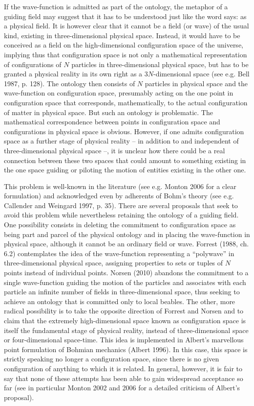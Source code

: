 \documentclass[12pt]{article}
\theoremstyle{definition}
\begin{document}
If the wave-function is admitted as part of the ontology, the metaphor of a guiding field may suggest that it has to be understood just like the word says: as a physical field. It is however clear that it cannot be a field (or wave) of the usual kind, existing in three-dimensional physical space. Instead, it would have to be conceived as a field on the high-dimensional configuration space of the universe, implying thus that configuration space is not only a mathematical representation of configurations of $N$ particles in three-dimensional physical space, but has to be granted a physical reality in its own right as a $3N$-dimensional space (see e.g. Bell 1987, p. 128). The ontology then consists of $N$ particles in physical space and the wave-function on configuration space, presumably acting on the one point in configuration space that corresponds, mathematically, to the actual configuration of matter in physical space. But such an ontology is problematic. The mathematical correspondence between points in configuration space and configurations in physical space is obvious. However, if one admits configuration space as a further stage of physical reality -- in addition to and independent of three-dimensional physical space --, it is unclear how there could be a real connection between these two spaces that could amount to something existing in the one space guiding or piloting the motion of entities existing in the other one.

This problem is well-known in the literature (see e.g. Monton 2006 for a clear formulation) and acknowledged even by adherents of Bohm's theory (see e.g. Callender and Weingard 1997, p. 35). There are several proposals that seek to avoid this problem while nevertheless retaining the ontology of a guiding field. One possibility consists in deleting the commitment to configuration space as being part and parcel of the physical ontology and in placing the wave-function in physical space, although it cannot be an ordinary field or wave. Forrest (1988, ch. 6.2) contemplates the idea of the wave-function representing a ``polywave'' in three-dimensional physical space, assigning properties to sets or tuples of $N$ points instead of individual points. Norsen (2010) abandons the commitment to a single wave-function guiding the motion of the particles and associates with each particle an infinite number of fields in three-dimensional space, thus seeking to achieve an ontology that is committed only to local beables. The other, more radical possibility is to take the opposite direction of Forrest and Norsen and to claim that the extremely high-dimensional space known as configuration space is itself the fundamental stage of physical reality, instead of three-dimensional space or four-dimensional space-time. This idea is implemented in Albert's marvellous point formulation of Bohmian mechanics (Albert 1996). In this case, this space is strictly speaking no longer a configuration space, since there is no given configuration of anything to which it is related. In general, however, it is fair to say that none of these attempts has been able to gain widespread acceptance so far (see in particular Monton 2002 and 2006 for a detailed criticism of Albert's proposal).
\end{document}
